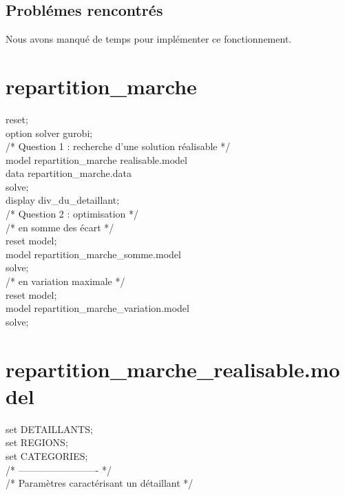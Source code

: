 \documentclass[a4paper,12pt,oneside]{report}
\begin{document}
\section{Problémes rencontrés}
Nous avons manqué de temps pour implémenter ce fonctionnement.

\appendix
\chapter{repartition\_marche}

reset;\\

option solver gurobi;\\

/* Question 1 : recherche d'une solution réalisable */\\
model repartition\_marche realisable.model\\
data repartition\_marche.data\\
solve;\\

display div\_du\_detaillant;\\


/* Question 2 : optimisation */\\

/* en somme des écart */\\
reset model;\\
model repartition\_marche\_somme.model\\
solve;\\

/* en variation maximale */\\
reset model;\\
model repartition\_marche\_variation.model\\
solve;\\

\chapter{repartition\_marche\_realisable.model}
set DETAILLANTS;\\
set REGIONS;\\
set CATEGORIES;\\

/* ------------------------- */\\
/* Paramètres caractérisant un détaillant */\\
\end{document}

